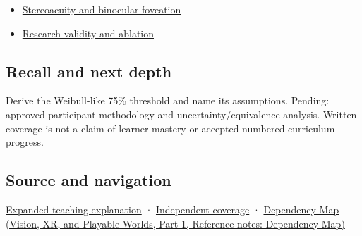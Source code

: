 \begin{itemize}
\tightlist
\item
  \hyperref[appendix-8dc848f14052]{Stereoacuity and binocular foveation}
\item
  \hyperref[appendix-65788587ef78]{Research validity and ablation}
\end{itemize}

\subsection{Recall and next depth}\label{appendix-1759f03e8ce7-recall-and-next-depth}

\hypertarget{appendix-1759f03e8ce7-recall-and-next-depth}{}

Derive the Weibull-like 75\% threshold and name its assumptions. Pending: approved participant methodology and uncertainty/equivalence analysis. Written coverage is not a claim of learner mastery or accepted numbered-curriculum progress.

\subsection{Source and navigation}\label{appendix-1759f03e8ce7-source-and-navigation}

\hypertarget{appendix-1759f03e8ce7-source-and-navigation}{}

\hyperref[04-visual-computing-ii-ch042-a-threshold-is-evidence-from-a-procedure-not-a-universal-border]{Expanded teaching explanation} · \hyperref[appendix-fd090d982a15-xr01---independent-seeing-and-representation-source]{Independent coverage} · \href{../07-Vision-XR-and-Playable-Worlds-P01/main.pdf\#appendix-4ad47bdd269a}{Dependency Map (Vision, XR, and Playable Worlds, Part 1, Reference notes: Dependency Map)}
